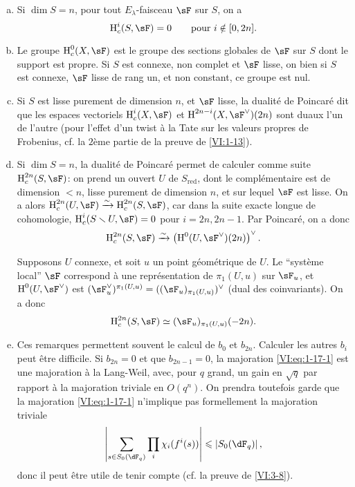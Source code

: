 \begin{enumerate}[a)]
  \item Si $\dim S=n$, pour tout $E_\lambda$-faisceau $\sF$ sur $S$, on a 
    \[
      \h_c^i(S,\sF) = 0 \qquad \text{pour $i\notin [0,2n]$.}
    \]
  \item Le groupe $\h_c^0(X,\sF)$ est le groupe des sections globales de $\sF$ 
    sur $S$ dont le support est propre. Si $S$ est connexe, non complet et 
    $\sF$ lisse, on bien si $S$ est connexe, $\sF$ lisse de rang un, et non 
    constant, ce groupe est nul.
  \item Si $S$ est lisse purement de dimension $n$, et $\sF$ lisse, la 
    dualité de Poincaré dit que les espaces vectoriels 
    $\h_c^i(X,\sF)$ et $\h^{2n-i}(X,\sF^\vee)(2n)$ sont duaux l'un de l'autre 
    (pour l'effet d'un twist à la Tate sur les valeurs propres de Frobenius, 
    cf. la $2$ème partie de la preuve de \ref{VI:1-13}).
  \item Si $\dim S=n$, la dualité de Poincaré permet de calculer comme 
    suite $\h_c^{2n}(S,\sF)$: on prend un ouvert $U$ de $S_\text{red}$, dont le 
    complémentaire est de dimension $<n$, lisse purement de dimension $n$, et 
    sur lequel $\sF$ est lisse. On a alors 
    $\h_c^{2n}(U,\sF) \iso \h_c^{2n}(S,\sF)$, car dans la suite exacte longue 
    de cohomologie, $\h_c^i(S\setminus U,\sF) = 0$ pour $i=2n,2n-1$. Par 
    Poincaré, on a donc 
    \[
      \h_c^{2n}(S,\sF) \iso \left(\h^0(U,\sF^\vee)(2n)\right)^\vee \text{.}
    \]
    
    Supposons $U$ connexe, et soit $u$ un point géométrique de $U$. Le 
    ``système local'' $\sF$ correspond à une représentation de 
    $\pi_1(U,u)$ sur $\sF_u$, et $\h^0(U,\sF^\vee)$ est 
    $(\sF_u^\vee)^{\pi_1(U,u)}=((\sF_u)_{\pi_1(U,u)})^\vee$ (dual des 
    coinvariants). On a donc 
    \[
      \h_c^{2n}(S,\sF) \simeq (\sF_u)_{\pi_1(U,u)}(-2n) \text{.}
    \]
  \item Ces remarques permettent souvent le calcul de $b_0$ et $b_{2n}$. 
    Calculer les autres $b_i$ peut être difficile. Si $b_{2n}=0$ et que 
    $b_{2n-1}=0$, la majoration \eqref{VI:eq:1-17-1} est une majoration à la 
    Lang-Weil, avec, pour $q$ grand, un gain en $\sqrt q$ par rapport à la 
    majoration triviale en $O(q^n)$. On prendra toutefois garde que la 
    majoration \eqref{VI:eq:1-17-1} n'implique pas formellement la majoration 
    triviale 
    \[
      \left|\sum_{s\in S_0(\dF_q)} \prod_i \chi_i(f^i(s))\right| \leqslant \left| S_0(\dF_q)\right| \text{,}
    \]
    donc il peut être utile de tenir compte (cf. la preuve de \ref{VI:3-8}). 
\end{enumerate}

